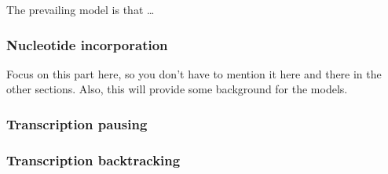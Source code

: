 The prevailing model is that \ldots

\subsubsection{Nucleotide incorporation}
Focus on this part here, so you don't have to mention it here and there in the
other sections. Also, this will provide some background for the models.

\subsubsection{Transcription pausing}

\subsubsection{Transcription backtracking}

